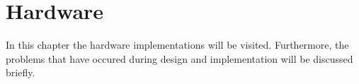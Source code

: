 \chapter{Hardware}
In this chapter the hardware implementations will be visited. Furthermore, the problems that have occured during design and implementation will be discussed briefly. 





